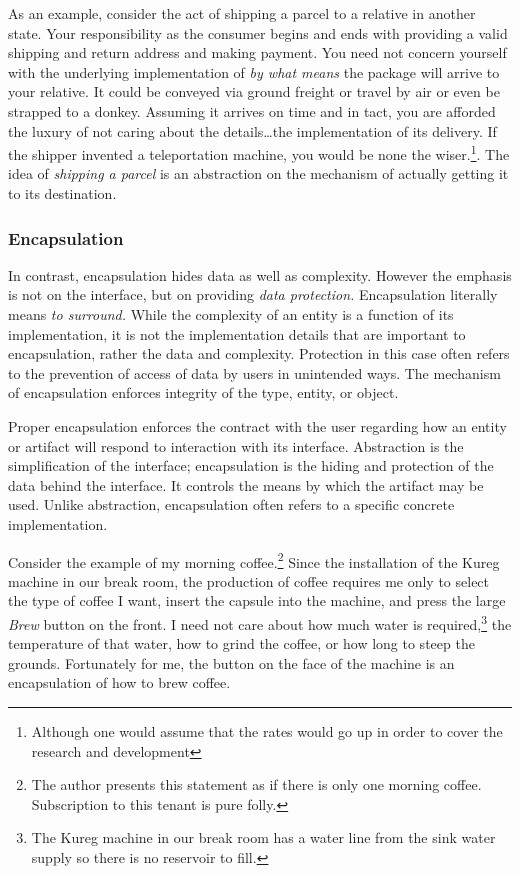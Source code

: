 \documentclass[jou,apacite]{apa6}
\begin{document}
As an example, consider the act of shipping a parcel to a relative in another state.  Your responsibility as the consumer begins and ends with providing a valid shipping and return address and making payment.  You need not concern yourself with the underlying implementation of \emph{by what means} the package will arrive to your relative.  It could be conveyed via ground freight or travel by air or even be strapped to a donkey.  Assuming it arrives on time and in tact, you are afforded the luxury of not caring about the details\dots the implementation of its delivery.  If the shipper invented a teleportation machine, you would be none the wiser.\footnote{Although one would assume that the rates would go up in order to cover the research and development}.  The idea of \emph{shipping a parcel} is an abstraction on the mechanism of actually getting it to its destination.

\subsubsection{Encapsulation}
In contrast, encapsulation hides  data as well as complexity.  However the emphasis is not on the interface, but on providing \emph{data protection.}  Encapsulation literally means \emph{to surround.}  While the complexity of an entity is a function of its implementation, it is not the implementation details that are important to encapsulation, rather the data and complexity.  Protection in this case often refers to the prevention of access of data by users in unintended ways.  The mechanism of encapsulation enforces integrity of the type, entity, or object.

Proper encapsulation enforces the contract with the user regarding how an entity or artifact will respond to interaction with its interface.  Abstraction is the simplification of the interface; encapsulation is the hiding and protection of the data behind the interface.  It controls the means by which the artifact may be used.  Unlike abstraction, encapsulation often refers to a specific concrete implementation.

Consider the example of my morning coffee.\footnote{The author presents this statement as if there is only one morning coffee.  Subscription to this tenant is pure folly.}  Since the installation of the Kureg machine in our break room, the production of coffee requires me only to select the type of coffee I want, insert the capsule into the machine, and press the large \emph{Brew} button on the front.  I need not care about how much water is required,\footnote{The Kureg machine in our break room has a water line from the sink water supply so there is no reservoir to fill.} the temperature of that water, how to grind the coffee, or how long to steep the grounds.  Fortunately for me, the button on the face of the machine is an encapsulation of how to brew coffee.
\end{document}
